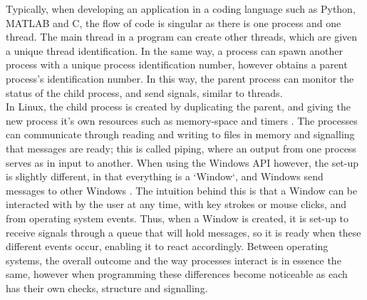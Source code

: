 \documentclass[12pt,openany,a4paper]{book}
\begin{document}
Typically, when developing an application in a coding language such as Python, MATLAB and C, the flow of code is singular as there is one process and one thread. The main thread in a program can create other threads, which are given a unique thread identification. In the same way, a process can spawn another process with a unique process identification number, however obtains a parent process's identification number. In this way, the parent process can monitor the status of the child process, and send signals, similar to threads. \\
In Linux, the child process is created by duplicating the parent, and giving the new process it's own resources such as memory-space and timers \cite{fork}. The processes can communicate through reading and writing to files in memory and signalling that messages are ready; this is called piping, where an output from one process serves as in input to another. When using the Windows API however, the set-up is slightly different, in that everything is a `Window`, and Windows send messages to other Windows \cite{MSDNmessages}. The intuition behind this is that a Window can be interacted with by the user at any time, with key strokes or mouse clicks, and from operating system events. Thus, when a Window is created, it is set-up to receive signals through a queue that will hold messages, so it is ready when these different events occur, enabling it to react accordingly. Between operating systems, the overall outcome and the way processes interact is in essence the same, however when programming these differences become noticeable as each has their own checks, structure and signalling.\\
\end{document}
